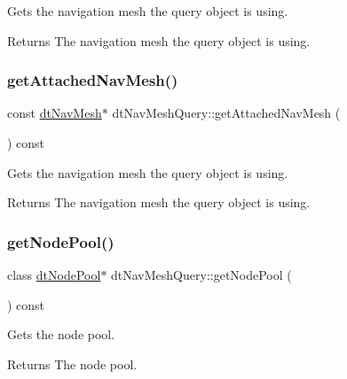 Gets the navigation mesh the query object is using. \begin{DoxyReturn}{Returns}
The navigation mesh the query object is using. 
\end{DoxyReturn}
\mbox{\label{classdtNavMeshQuery_a05ddaa41019804494be7da66207882de}} 
\subsubsection{\texorpdfstring{get\+Attached\+Nav\+Mesh()}{getAttachedNavMesh()}\hspace{0.1cm}{\footnotesize\ttfamily [2/2]}}
{\footnotesize\ttfamily const \hyperlink{classdtNavMesh}{dt\+Nav\+Mesh}$\ast$ dt\+Nav\+Mesh\+Query\+::get\+Attached\+Nav\+Mesh (\begin{DoxyParamCaption}{ }\end{DoxyParamCaption}) const\hspace{0.3cm}{\ttfamily [inline]}}

Gets the navigation mesh the query object is using. \begin{DoxyReturn}{Returns}
The navigation mesh the query object is using. 
\end{DoxyReturn}
\mbox{\label{classdtNavMeshQuery_a5f5baaa868aad36ba023ea81b10e70bd}} 
\subsubsection{\texorpdfstring{get\+Node\+Pool()}{getNodePool()}\hspace{0.1cm}{\footnotesize\ttfamily [1/2]}}
{\footnotesize\ttfamily class \hyperlink{classdtNodePool}{dt\+Node\+Pool}$\ast$ dt\+Nav\+Mesh\+Query\+::get\+Node\+Pool (\begin{DoxyParamCaption}{ }\end{DoxyParamCaption}) const\hspace{0.3cm}{\ttfamily [inline]}}

Gets the node pool. \begin{DoxyReturn}{Returns}
The node pool. 
\end{DoxyReturn}
\mbox{\label{classdtNavMeshQuery_a5f5baaa868aad36ba023ea81b10e70bd}} 
